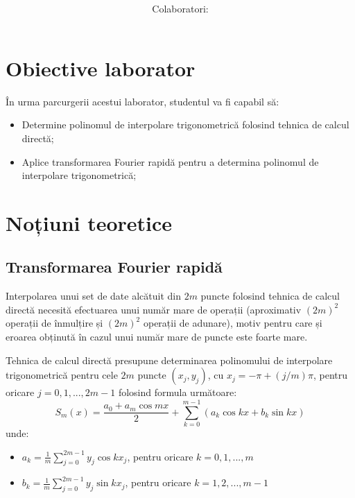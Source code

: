 \documentclass{exam}
\title{
	\textmd{\textbf{\MNLabTitle}}
	\author{Colaboratori: \MNAuthor}
}
\begin{document}
\begin{coverpages}

	\maketitle
	\tableofcontents

\end{coverpages}

\section{Obiective laborator}

În urma parcurgerii acestui laborator, studentul va fi capabil să:

\begin{itemize}
	\item Determine polinomul de interpolare trigonometrică folosind tehnica de calcul directă;
	\item Aplice transformarea Fourier rapidă pentru a determina polinomul de interpolare trigonometrică;
\end{itemize}


\section{Noțiuni teoretice}

\subsection{Transformarea Fourier rapidă}

Interpolarea unui set de date alcătuit din $2m$ puncte folosind tehnica de calcul directă necesită efectuarea unui număr mare de operații (aproximativ $(2m)^{2}$ operații de înmulțire și $(2m)^{2}$ operații de adunare), motiv pentru care și eroarea obținută în cazul unui număr mare de puncte este foarte mare.


Tehnica de calcul directă presupune determinarea polinomului de interpolare trigonometrică pentru cele $2m$ puncte ${(x_j, y_j)}$, cu $x_j = -\pi + (j/m)\pi$, pentru oricare $j = 0, 1, ..., 2m-1$ folosind  formula următoare:
$$S_m(x) = \frac{a_0 + a_m\cos mx}{2} + \sum_{k=0}^{m-1} (a_k\cos kx + b_k\sin kx)$$
unde:
\begin{itemize}
	\item$a_k = \frac{1}{m}\sum_{j=0}^{2m-1} y_j\cos kx_j$, pentru oricare $k=0, 1, ..., m$
	\item$b_k = \frac{1}{m}\sum_{j=0}^{2m-1} y_j\sin kx_j$, pentru oricare $k=1, 2, ..., m-1$
\end{itemize}
\end{document}
